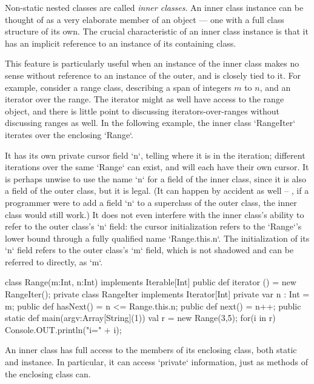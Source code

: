 Non-static nested classes are called {\em inner classes}. An inner class
instance can be thought of as a very elaborate member of an object --- one
with a full class structure of its own.   The crucial characteristic of an
inner class instance is that it has an implicit reference to an instance of
its containing class.  

\begin{ex}
This feature is particularly useful when an instance of the inner class makes
no sense without reference to an instance of the outer, and is closely tied to
it.  For example, consider a range class, describing a span of integers {$m$}
to {$n$}, and an iterator over the range.  The iterator might as well have
access to the range object, and there is little point to discussing
iterators-over-ranges without discussing ranges as well.
In the following example, the inner class \xcd`RangeIter` iterates over the
enclosing \xcd`Range`.  

It has its own private cursor field \xcd`n`, telling
where it is in the iteration; different iterations over the same \xcd`Range`
can exist, and will each have their own cursor.
It is perhaps unwise to use the name \xcd`n` for a field of the inner class,
since it is also a field of the outer class, but it is legal.  (It can happen
by accident as well -- \eg, if a programmer were to add a field \xcd`n` to a
superclass of the  outer class, the inner class would still work.)
It does not even
interfere with the inner class's ability to refer to the outer class's \xcd`n`
field: the cursor initialization 
refers to the \xcd`Range`'s lower bound through a fully qualified name
\xcd`Range.this.n`.
The initialization of its \xcd`n` field refers to the outer class's \xcd`m` field, which is
not shadowed and can be referred to directly, as \xcd`m`.


\begin{xten}
class Range(m:Int, n:Int) implements Iterable[Int]{
  public def iterator ()  = new RangeIter();
  private class RangeIter implements Iterator[Int] {
     private var n : Int = m;
     public def hasNext() = n <= Range.this.n;
     public def next() = n++;
  }
  public static def main(argv:Array[String](1)) {
    val r = new Range(3,5);
    for(i in r) Console.OUT.println("i=" + i);
  }
}
\end{xten}
%
\end{ex}

An inner class has full access to the members of its enclosing class, both
static and instance.  In particular, it can access \xcd`private` information,
just as methods of the enclosing class can.  

